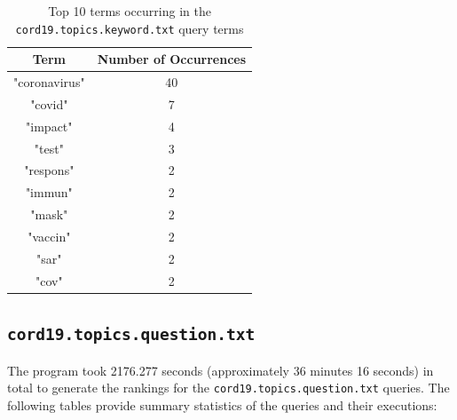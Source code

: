 \documentclass[11pt]{article}
\begin{document}
\begin{table}[!ht]
    \caption{Top 10 terms occurring in the \texttt{cord19.topics.keyword.txt} query terms}
    \begin{center}

        \begin{tabular}{| c | c |}
        \hline
        \textbf{Term} & \textbf{Number of Occurrences}
        \\ \hline
        "coronavirus" & 40
        \\ \hline
        "covid" & 7
        \\ \hline
        "impact" & 4
        \\ \hline
        "test" & 3
        \\ \hline
        "respons" & 2
        \\ \hline
        "immun" & 2
        \\ \hline
        "mask" & 2
        \\ \hline
        "vaccin" & 2
        \\ \hline
        "sar" & 2
        \\ \hline
        "cov" & 2
        \\ \hline
        \end{tabular}

    \end{center}

\end{table}

\subsection{\texttt{cord19.topics.question.txt}}
The program took 2176.277 seconds (approximately 36 minutes 16 seconds) in total to generate the rankings for the \texttt{cord19.topics.question.txt} queries. The following tables provide summary statistics of the queries and their executions:

\end{document}
